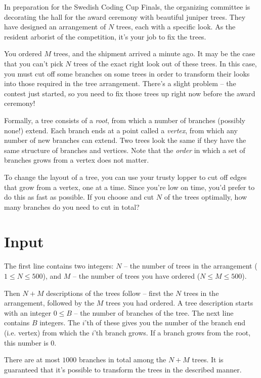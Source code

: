 In preparation for the Swedish Coding Cup Finals, the organizing committee is decorating the hall for the award ceremony with beautiful juniper trees.
They have designed an arrangement of $N$ trees, each with a specific look.
As the resident arborist of the competition, it's your job to fix the trees.

You ordered $M$ trees, and the shipment arrived a minute ago.
It may be the case that you can't pick $N$ trees of the exact right look out of these trees.
In this case, you must cut off some branches on some trees in order to transform their looks into those required in the tree arrangement.
There's a slight problem -- the contest just started, so you need to fix those trees up right now before the award ceremony!

Formally, a tree consists of a \emph{root}, from which a number of branches (possibly none!) extend.
Each branch ends at a point called a \emph{vertex}, from which any number of new branches can extend.
Two trees look the same if they have the same structure of branches and vertices.
Note that the \emph{order} in which a set of branches grows from a vertex does not matter.

To change the layout of a tree, you can use your trusty lopper to cut off edges that grow from a vertex, one at a time.
Since you're low on time, you'd prefer to do this as fast as possible.
If you choose and cut $N$ of the trees optimally, how many branches do you need to cut in total?

\section*{Input}
The first line contains two integers:
  $N$ -- the number of trees in the arrangement ($1 \le N \le 500$), and
  $M$ -- the number of trees you have ordered ($N \le M \le 500$).

Then $N + M$ descriptions of the trees follow -- first the $N$ trees in the arrangement, followed by the $M$ trees you had ordered.
A tree description starts with an integer $0 \le B$ -- the number of branches of the tree.
The next line contains $B$ integers.
The $i$'th of these gives you the number of the branch end (i.e. vertex) from which the $i$'th branch grows.
If a branch grows from the root, this number is $0$.

There are at most $1000$ branches in total among the $N + M$ trees.
It is guaranteed that it's possible to transform the trees in the described manner.

